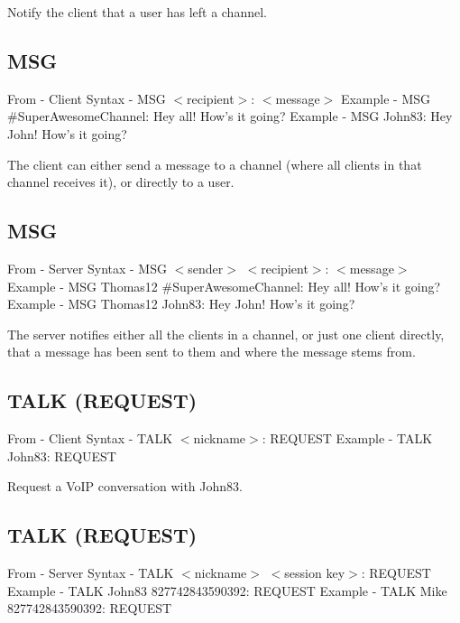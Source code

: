 \documentclass[12pt]{rapport}
\begin{document}
\noindent Notify the client that a user has left a channel.

\subsection*{MSG}
From    - Client\newline
Syntax  - MSG $<$recipient$>$: $<$message$>$\newline
Example - MSG \#SuperAwesomeChannel: Hey all! How's it going?\newline
Example - MSG John83: Hey John! How's it going?\newline

\noindent The client can either send a message to a channel (where all clients in that channel receives it), or directly to a user.

\subsection*{MSG}
From    - Server\newline
Syntax  - MSG $<$sender$>$ $<$recipient$>$: $<$message$>$\newline
Example - MSG Thomas12 \#SuperAwesomeChannel: Hey all! How's it going?\newline
Example - MSG Thomas12 John83: Hey John! How's it going?\newline

\noindent The server notifies either all the clients in a channel, or just one client directly, that a message has been sent to them and where the message stems from.

\subsection*{TALK (REQUEST)}
From    - Client\newline
Syntax  - TALK $<$nickname$>$: REQUEST\newline
Example - TALK John83: REQUEST\newline

\noindent Request a VoIP conversation with John83.

\subsection*{TALK (REQUEST)}
From    - Server\newline
Syntax  - TALK $<$nickname$>$ $<$session key$>$: REQUEST\newline
Example - TALK John83 827742843590392: REQUEST\newline
Example - TALK Mike 827742843590392: REQUEST\newline
\end{document}
